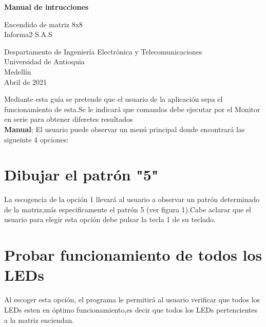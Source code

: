 \documentclass{article}
\begin{document}
\begin{titlepage}
    \begin{center}
        \vspace*{4cm}
            
        \Huge
        \textbf{Manual de intrucciones}
            
        \vspace{0.5cm}
        \LARGE
        Encendido de matriz 8x8\\ Informa2 S.A.S
            
        \vspace{1.5cm}
            
  
            
        \vfill
            
        \vspace{0.8cm}
            
        \Large
        Despartamento de Ingeniería Electrónica y Telecomunicaciones\\
        Universidad de Antioquia\\
        Medellín\\
        Abril de 2021
            
    \end{center}
\end{titlepage}

\tableofcontents
\newpage

 Mediante esta guía se pretende que el usuario de la aplicación sepa el funcionamiento de esta.Se le indicará que comandos debe ejecutar por el Monitor en serie para obtener diferetes resultados\\

\textbf{Manual}: El usuario puede observar un menú principal 
donde encontrará las sigueinte 4 opciones:

\section{Dibujar el patrón "5"}\label{op1}
La escogencia de la opción 1 llevará al usuario a observar un patrón determinado de la matriz,más especificamente el patrón 5 (ver figura 1).Cabe aclarar que el usuario para elegir esta opción debe pulsar la tecla 1 de su teclado.

\section{Probar funcionamiento de todos los LEDs}\label{op2}
Al escoger esta opción, el programa le permitirá al usuario verificar que todos los LEDs esten en óptimo funcionamiento,es decir que todos los LEDs pertencientes a la matriz enciendan.
\end{document}
